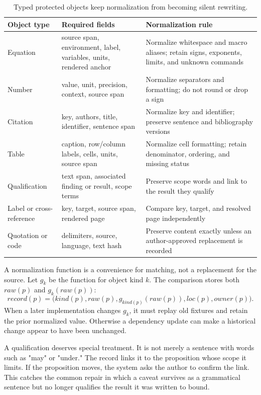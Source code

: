 \begin{table}[H]
\centering
\small
\begin{tabularx}{\textwidth}{@{}p{}p{}L@{}}
\toprule
Object type & Required fields & Normalization rule \\
\midrule
Equation & source span, environment, label, variables, units, rendered anchor &
Normalize whitespace and macro aliases; retain signs, exponents, limits, and
unknown commands \\
Number & value, unit, precision, context, source span & Normalize separators and
formatting; do not round or drop a sign \\
Citation & key, authors, title, identifier, sentence span & Normalize key and
identifier; preserve sentence and bibliography versions \\
Table & caption, row/column labels, cells, units, source span & Normalize cell
formatting; retain denominator, ordering, and missing status \\
Qualification & text span, associated finding or result, scope terms & Preserve
scope words and link to the result they qualify \\
Label or cross-reference & key, target, source span, rendered page & Compare
key, target, and resolved page independently \\
Quotation or code & delimiters, source, language, text hash & Preserve content
exactly unless an author-approved replacement is recorded \\
\bottomrule
\end{tabularx}
\caption{Typed protected objects keep normalization from becoming silent
rewriting.}
\label{tab:manual-object-dictionary}
\end{table}

A normalization function is a convenience for matching, not a replacement for
the source. Let $g_k$ be the function for object kind $k$. The comparison
stores both $raw(p)$ and $g_k(raw(p))$:
\begin{equation}
  record(p)=\bigl(kind(p),raw(p),g_{kind(p)}(raw(p)),loc(p),owner(p)\bigr).
  \label{eq:manual-object-record}
\end{equation}
When a later implementation changes $g_k$, it must replay old fixtures and
retain the prior normalized value. Otherwise a dependency update can make a
historical change appear to have been unchanged.

A qualification deserves special treatment. It is not merely a sentence with
words such as "may" or "under." The record links it to the proposition whose
scope it limits. If the proposition moves, the system asks the author to
confirm the link. This catches the common repair in which a caveat survives as
a grammatical sentence but no longer qualifies the result it was written to
bound.
